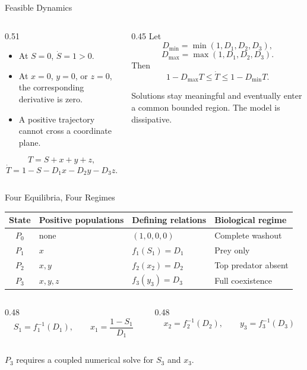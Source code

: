 \begin{frame}{Feasible Dynamics}
  \begin{columns}[T,onlytextwidth]
    \begin{column}{0.51\textwidth}
      \begin{itemize}
        \item At $S=0$, $\dot S=1>0$.
        \item At $x=0$, $y=0$, or $z=0$, the corresponding derivative is zero.
        \item A positive trajectory cannot cross a coordinate plane.
      \end{itemize}
      \vspace{0.25cm}
      \[
        T=S+x+y+z,
      \]
      \[
        \dot T=1-S-D_1x-D_2y-D_3z.
      \]
    \end{column}
    \begin{column}{0.45\textwidth}
      Let
      \[
        D_{\min}=\min(1,D_1,D_2,D_3),
      \]
      \[
        D_{\max}=\max(1,D_1,D_2,D_3).
      \]
      Then
      \[
        1-D_{\max}T\le \dot T\le 1-D_{\min}T.
      \]
      \par
      Solutions stay meaningful and eventually enter a common bounded region.
      The model is dissipative.
    \end{column}
  \end{columns}
\end{frame}

\begin{frame}{Four Equilibria, Four Regimes}
  \renewcommand{\arraystretch}{1.18}
  \begin{tabular}{clll}
    \toprule
    State & Positive populations & Defining relations & Biological regime \\
    \midrule
    $P_0$ & none
      & $(1,0,0,0)$
      & Complete washout \\
    $P_1$ & $x$
      & $f_1(S_1)=D_1$
      & Prey only \\
    $P_2$ & $x,y$
      & $f_2(x_2)=D_2$
      & Top predator absent \\
    $P_3$ & $x,y,z$
      & $f_3(y_3)=D_3$
      & Full coexistence \\
    \bottomrule
  \end{tabular}

  \vspace{0.45cm}
  \begin{columns}[T,onlytextwidth]
    \begin{column}{0.48\textwidth}
      \[
        S_1=f_1^{-1}(D_1),\qquad
        x_1=\frac{1-S_1}{D_1}
      \]
    \end{column}
    \begin{column}{0.48\textwidth}
      \[
        x_2=f_2^{-1}(D_2),\qquad
        y_3=f_3^{-1}(D_3)
      \]
    \end{column}
  \end{columns}
  \vspace{0.15cm}
  \centering\color{MidGray}
  $P_3$ requires a coupled numerical solve for $S_3$ and $x_3$.
\end{frame}

